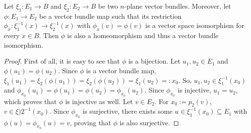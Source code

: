\begin{proposition}\label{prop:local_to_global_iso_vector} Let $\xi_1:E_1\to B$ and $\xi_2:E_2\to B$ be two $n$-plane vector bundles. Moreover, let $\phi:E_1\to E_2$ be a vector bundle map such that its restriction
$\phi_x:\xi_1^{-1}(x)\to\xi_2^{-1}(x)$
with $\phi_x(v)=\phi(v)$ is a vector space isomorphism for every $x\in B$. Then $\phi$ is also a homeomorphism and thus a vector bundle isomorphism.
\end{proposition}
\begin{proof} First of all, it is easy to see that $\phi$ is a bijection.
Let $u_1,u_2\in E_1$ and $\phi(u_1)=\phi(u_2)$. Since $\phi$ is a vector bundle map,
$\xi_1(u_1)=\xi_2(\phi(u_1))=\xi_2(\phi(u_2))=\xi_1(u_2)=:x_0$.
So, $u_1,u_2\in\xi_1^{-1}(x_0)$ and $\phi_{x_0}(u_1)=\phi(u_1)=\phi(u_2)=\phi_{x_0}(u_2)$. Since $\phi_{x_0}$ is injective, $u_1=u_2$, which proves that $\phi$ is injective as well.
Let $v\in E_2$. For $x_0:=p_2(v)$, $v\in\xi)2^{-1}(x_0)$. Since $\phi_{x_0}$ is surjective, there exists some $u\in\xi_1^{-1}(x_0)\subseteq E_1$ with $\phi(u)=\phi_{x_0}(u)=v$, proving that $\phi$ is also surjective.


\end{proof}
